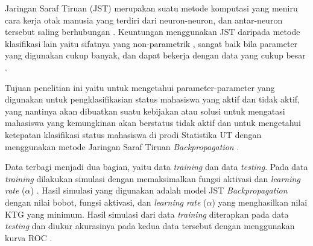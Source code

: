 Jaringan Saraf Tiruan (JST) merupakan suatu metode komputasi yang meniru cara kerja otak manusia yang terdiri dari neuron-neuron, dan antar-neuron tersebut saling berhubungan \cite{haykin-2007:neutral-networks}. Keuntungan menggunakan JST daripada metode klasifikasi lain yaitu sifatnya yang non-parametrik \cite{paola-1995:review-analysis-backpropagation}, sangat baik bila parameter yang digunakan cukup banyak, dan dapat bekerja dengan data yang cukup besar \cite{chiroma-2018:}.

Tujuan penelitian ini yaitu untuk mengetahui parameter-parameter yang digunakan untuk pengklasifikasian status mahasiswa yang aktif dan tidak aktif, yang nantinya akan dibuatkan suatu kebijakan atau solusi untuk mengatasi mahasiswa yang kemungkinan akan berstatus tidak aktif dan untuk mengetahui ketepatan klasifikasi status mahasiswa di prodi Statistika UT dengan menggunakan metode Jaringan Saraf Tiruan \textit{Backpropagation} \cite{Hasanah-2014:isoss}.

Data terbagi menjadi dua bagian, yaitu data \textit{training} dan data \textit{testing}. Pada data \textit{training} dilakukan simulasi dengan memaksimalkan fungsi aktivasi dan \textit{learning rate} ($\alpha$) \cite{Boithias-2012}. Hasil simulasi yang digunakan adalah model JST \textit{Backpropagation} dengan nilai bobot, fungsi aktivasi, dan \textit{learning rate} ($\alpha$) yang menghasilkan nilai KTG yang minimum. Hasil simulasi dari data \textit{training} diterapkan pada data \textit{testing} dan diukur akurasinya pada kedua data tersebut dengan menggunakan kurva ROC \cite{kalyan-2014}.